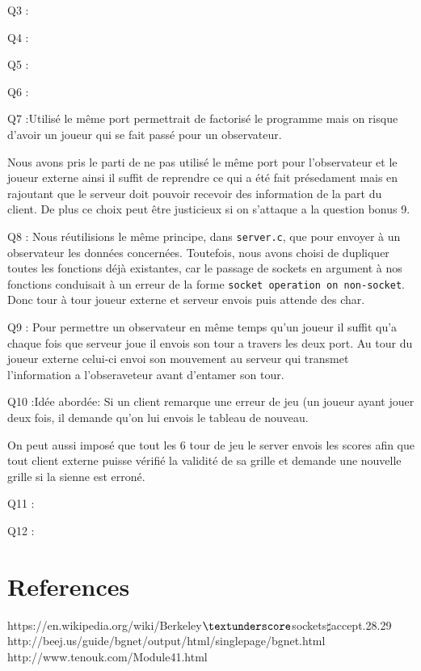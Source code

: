 \documentclass[a4paper]{article}
\begin{document}
\bigskip

Q3 :


\bigskip

Q4 :
\bigskip

Q5 :
\bigskip

Q6 :
\bigskip

Q7 :Utilisé le même port permettrait de factorisé le programme mais on risque d'avoir un joueur qui se fait passé pour un observateur.

Nous avons pris le parti de ne pas utilisé le même port pour l'observateur et le joueur externe ainsi il suffit de reprendre ce qui a été fait présedament mais en rajoutant que le serveur doit pouvoir recevoir des information de la part du client. De plus ce choix peut être justicieux si on s'attaque a la question bonus 9.

\bigskip

Q8 : Nous réutilisions le même principe, dans \texttt{server.c}, que pour envoyer à un observateur les données concernées. Toutefois, nous avons choisi de dupliquer toutes les fonctions déjà existantes, car le passage de sockets en argument à nos fonctions conduisait à un erreur de la forme \texttt{socket operation on non-socket}.
\bigskip
Donc tour à tour joueur externe et serveur envois puis attende des char.  
\bigskip


Q9 : Pour permettre un observateur en même temps qu'un joueur il suffit qu'a chaque fois que serveur joue il envois son tour a travers les deux port. Au tour du joueur externe celui-ci envoi son mouvement au serveur qui transmet l'information a l'obseraveteur avant d'entamer son tour.
\bigskip

Q10 :Idée abordée:
 Si un client remarque une erreur de jeu (un joueur ayant jouer deux fois, il demande qu'on lui envois le tableau de nouveau.

 On peut aussi imposé que tout les 6 tour de jeu le server envois les scores afin que tout client externe puisse vérifié la validité de sa grille et demande une nouvelle grille si la sienne est erroné.
 
Q11 : 

Q12 : 

\section{References}
https://en.wikipedia.org/wiki/Berkeley$\textunderscore$sockets$\sharp$accept.28.29
http://beej.us/guide/bgnet/output/html/singlepage/bgnet.html
http://www.tenouk.com/Module41.html
\end{document}

